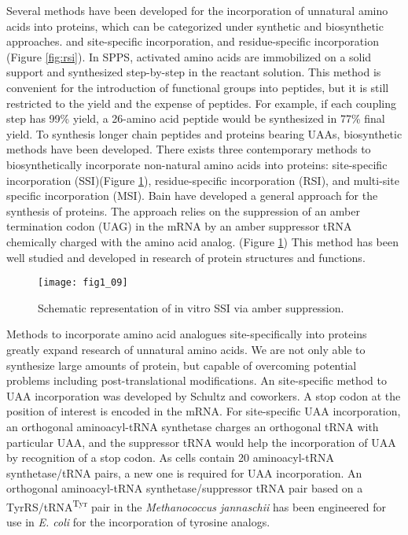 \begin{refsection}
Several methods have been developed for the incorporation of unnatural amino
acids into proteins, which can be categorized under synthetic and biosynthetic
approaches.  and  site-specific
incorporation,\cite{Cellitti2008,Hassan2008} and residue-specific incorporation
(Figure \ref{fig:rsi})\cite{Johnson2010}.  In SPPS, activated amino acids are
immobilized on a solid support and synthesized step-by-step in the reactant
solution. This method is convenient for the introduction of functional groups
into peptides, but it is still restricted to the yield and the expense of
peptides. For example, if each coupling step has 99\% yield, a 26-amino acid
peptide would be synthesized in 77\% final yield.  To synthesis longer chain
peptides and proteins bearing UAAs, biosynthetic methods have been developed.
There exists three contemporary methods to biosynthetically incorporate
non-natural amino acids into proteins: site-specific incorporation (SSI)(Figure
\ref{fig:ssi-intro}), residue-specific incorporation (RSI), and multi-site
specific incorporation (MSI). Bain  have developed a general
approach for the  synthesis of proteins\cite{Bain1991}.  The
approach relies on the suppression of an amber termination codon (UAG) in the
mRNA by an amber suppressor tRNA chemically charged with the amino acid analog.
(Figure \ref{fig:ssi-intro}) This method has been well studied and developed in
research of protein structures and functions\cite{Martoglio1995,Eichler1997}.

\begin{figure}[h!] \centering \texttt{[image: fig1\_09]}
    \caption[Schematic representation of in vitro SSI via amber
    suppression.]{Schematic representation of in vitro SSI via amber
    suppression.} 
    \label{fig:ssi-intro} 
\end{figure}

Methods to incorporate amino acid analogues site-specifically into proteins
 greatly expand research of unnatural amino acids. We are not
only able to synthesize large amounts of protein, but capable of overcoming
potential problems including post-translational modifications. An  site-specific method to UAA incorporation was developed by Schultz and
coworkers\cite{Wang2001,Wang2002}. A stop codon at the position of interest is
encoded in the mRNA. For  site-specific UAA incorporation, an
orthogonal aminoacyl-tRNA synthetase charges an orthogonal tRNA with particular
UAA, and the suppressor tRNA would help the incorporation of UAA by recognition
of a stop codon. As cells contain 20 aminoacyl-tRNA synthetase/tRNA pairs, a
new one is required for UAA incorporation. An orthogonal aminoacyl-tRNA
synthetase/suppressor tRNA pair based on a TyrRS/tRNA\textsuperscript{Tyr} pair
in the \emph{Methanococcus jannaschii} has been engineered for use in \emph{E.
coli} for the incorporation of tyrosine analogs\cite{Wang2001}.


\end{refsection}
